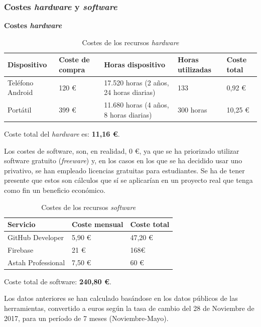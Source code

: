 \documentclass[twoside]{report}
\begin{document}
\subsubsection{Costes \textit{hardware} y \textit{software}}
\textbf{Costes \textit{hardware}}
\begin{table}[H]
\center
\begin{tabular}{|l|l|l|l|l|}
\hline
Dispositivo        & Coste de compra   & Horas dispositivo & Horas utilizadas & Coste total \\ \hline
Teléfono Android   & 120 \euro      & 17.520 horas (2 años, 24 horas diarias)  & 133  & 0,92  \euro \\ \hline
Portátil      & 399 \euro   &  11.680 horas (4 años, 8 horas diarias) & 300 horas  & 10,25 \euro \\ \hline
\end{tabular}
\caption{Costes de los recursos \textit{hardware}}
\end{table}

Coste total del \textit{hardware} es: \textbf{11,16 \euro}.

Los costes de software, son, en realidad, 0 \euro, ya que se ha priorizado utilizar software gratuito (\textit{freeware}) y,  en los casos en los que se ha decidido usar uno privativo, se han empleado licencias gratuitas para estudiantes. Se ha de tener presente que estos son cálculos que sí se aplicarían en un proyecto real que tenga como fin un beneficio económico.

\begin{table}[H]
\centering
\begin{tabular}{|l|l|l|}
\hline
Servicio         & Coste mensual & Coste total \\ \hline
GitHub Developer & 5,90 \euro        & 47,20 \euro          \\ \hline
Firebase         & 21 \euro      & 168\euro           \\ \hline
Astah Professional & 7,50 \euro & 60 \euro \\ \hline
\end{tabular}
\caption{Costes de los recursos \textit{software}}
\end{table}

Coste total de software: \textbf{240,80 \euro}.

Los datos anteriores se han calculado basándose en los datos públicos de las herramientas, convertido a euros según la tasa de cambio del 28 de Noviembre de 2017, para un período de 7 meses (Noviembre-Mayo).
\end{document}
